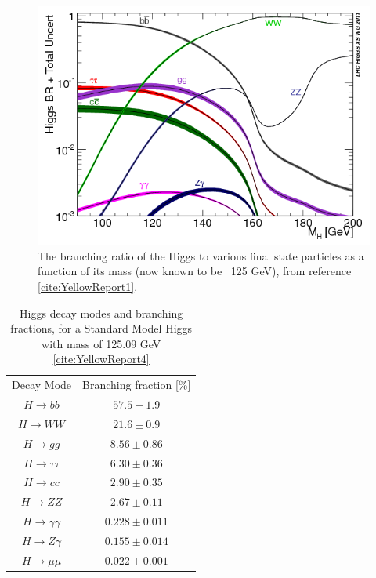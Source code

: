 \begin{figure}
\includegraphics[width=\linewidth]{figures/theory_chapter/HiggsBR.png}
\caption{The branching ratio of the Higgs to various final state particles as a function of its mass (now known to be ~125 GeV), from reference \ref{cite:YellowReport1}.}
\end{figure}

\begin{table}[h]
    \centering
    \begin{tabular}{cc}
        	Decay Mode & Branching fraction [\%] \\
            $H \rightarrow bb $ & $ 57.5 \pm 1.9 $ \\
			$H \rightarrow WW $ & $ 21.6 \pm 0.9 $ \\
			$H \rightarrow gg $ & $ 8.56 \pm 0.86 $ \\
			$H \rightarrow \tau \tau $ & $ 6.30 \pm 0.36 $ \\
			$H \rightarrow cc $ & $ 2.90 \pm 0.35 $ \\
			$H \rightarrow ZZ $ & $ 2.67 \pm 0.11 $ \\
			$H \rightarrow \gamma \gamma $ & $ 0.228 \pm 0.011 $ \\
			$H \rightarrow Z \gamma $ & $ 0.155 \pm 0.014 $ \\
			$H \rightarrow \mu \mu $ & $ 0.022 \pm 0.001 $ \\
    \end{tabular}
    \caption{Higgs decay modes and branching fractions, for a Standard Model Higgs with mass of 125.09 GeV \ref{cite:YellowReport4}}
    \label{mytable}
\end{table}

